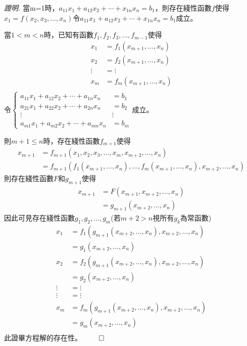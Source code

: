 \documentclass[12pt]{article}
\renewenvironment*{proof}{\textit{證明.}}{\hfill$\qed$}
\begin{document}
    \begin{proof}
        當m=1時，$a_{11}x_1+a_{12}x_2+\cdots+x_{1n}x_{n}=b_1$，則存在綫性函數$f$使得$x_1=f(x_2,x_3,\dots,x_n)$令$a_{11}x_1+a_{12}x_2+\cdots+x_{1n}x_{n}=b_1$成立。

        當$1<m<n$時，已知有函數$f_1,f_2,f_3,\dots,f_{m-1}$使得\begin{align*}
            x_1&=f_1(x_{m+1}, \dots, x_n)\\
            x_2&=f_2(x_{m+1}, \dots, x_n)\\
            \vdots&=\vdots\\
            x_{m}&=f_{m}(x_{m+1}, \dots, x_n)\\
        \end{align*}令$\begin{cases}
            a_{11}x_1+a_{12}x_2+\cdots+a_{1n}x_{n}&=b_1\\
            a_{21}x_1+a_{22}x_2+\cdots+a_{2n}x_{n}&=b_2\\
            \vdots&\vdots\\
            a_{m1}x_1+a_{m2}x_2+\cdots+a_{mn}x_{n}&=b_m
        \end{cases}$成立。

        則$m+1\leq n$時，存在綫性函數$f_{m+1}$使得\begin{align*}
            x_{m+1}&=f_{m+1}(x_1,x_2,x_3,\dots,x_{m},x_{m+2},\dots,x_n)\\
            &=f_{m+1}(f_1(x_{m+1}, \dots, x_n),\dots,f_{m}(x_{m+1}, \dots, x_n),x_{m+2},\dots,x_n)
        \end{align*}
        則存在綫性函數$F$和$g_{m+1}$使得\begin{align*}
            x_{m+1}&=F(x_{m+1},x_{m+2},\dots,x_n)\\
            &=g_{m+1}(x_{m+2},\dots,x_n)
        \end{align*}
        因此可見存在綫性函數$g_1,g_2,\dots,g_m$(若$m+2>n$視所有$g_k$為常函數)\begin{align*}
            x_1&=f_1(g_{m+1}(x_{m+2},\dots,x_n),x_{m+2}, \dots, x_n)\\
            &=g_1(x_{m+2}, \dots, x_n)\\
            x_2&=f_2(g_{m+1}(x_{m+2},\dots,x_n),x_{m+2}, \dots, x_n)\\
            &=g_2(x_{m+2}, \dots, x_n)\\
            \vdots&=\vdots\\
            \vdots&=\vdots\\
            x_{m}&=f_{m}(g_{m+1}(x_{m+2},\dots,x_n),x_{m+2}, \dots, x_n)\\&=g_m(x_{m+2}, \dots, x_n)\\
        \end{align*}
        此證畢方程解的存在性。
    \end{proof}
\end{document}
